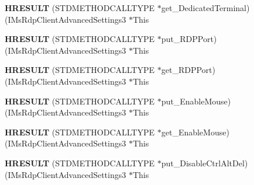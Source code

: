 \begin{DoxyCompactItemize}
\mbox{\label{struct_i_ms_rdp_client_advanced_settings3_vtbl_a5ea44e8e6ebad06757ed384928975116}} 
{\bfseries H\+R\+E\+S\+U\+LT} (S\+T\+D\+M\+E\+T\+H\+O\+D\+C\+A\+L\+L\+T\+Y\+PE $\ast$get\+\_\+\+Dedicated\+Terminal)(I\+Ms\+Rdp\+Client\+Advanced\+Settings3 $\ast$This
\item 
\mbox{\label{struct_i_ms_rdp_client_advanced_settings3_vtbl_ab1a172377b0c5ec4c281a64af648d1d4}} 
{\bfseries H\+R\+E\+S\+U\+LT} (S\+T\+D\+M\+E\+T\+H\+O\+D\+C\+A\+L\+L\+T\+Y\+PE $\ast$put\+\_\+\+R\+D\+P\+Port)(I\+Ms\+Rdp\+Client\+Advanced\+Settings3 $\ast$This
\item 
\mbox{\label{struct_i_ms_rdp_client_advanced_settings3_vtbl_a48acd1d762df5e480533a343f26c7cfc}} 
{\bfseries H\+R\+E\+S\+U\+LT} (S\+T\+D\+M\+E\+T\+H\+O\+D\+C\+A\+L\+L\+T\+Y\+PE $\ast$get\+\_\+\+R\+D\+P\+Port)(I\+Ms\+Rdp\+Client\+Advanced\+Settings3 $\ast$This
\item 
\mbox{\label{struct_i_ms_rdp_client_advanced_settings3_vtbl_a06a9c6b74b1d1fa429956ccb4242fb3f}} 
{\bfseries H\+R\+E\+S\+U\+LT} (S\+T\+D\+M\+E\+T\+H\+O\+D\+C\+A\+L\+L\+T\+Y\+PE $\ast$put\+\_\+\+Enable\+Mouse)(I\+Ms\+Rdp\+Client\+Advanced\+Settings3 $\ast$This
\item 
\mbox{\label{struct_i_ms_rdp_client_advanced_settings3_vtbl_aac3562d4b808014c2419c41a13f5f0e8}} 
{\bfseries H\+R\+E\+S\+U\+LT} (S\+T\+D\+M\+E\+T\+H\+O\+D\+C\+A\+L\+L\+T\+Y\+PE $\ast$get\+\_\+\+Enable\+Mouse)(I\+Ms\+Rdp\+Client\+Advanced\+Settings3 $\ast$This
\item 
\mbox{\label{struct_i_ms_rdp_client_advanced_settings3_vtbl_afb2ba47be2ba24b17eeaf02efeca7523}} 
{\bfseries H\+R\+E\+S\+U\+LT} (S\+T\+D\+M\+E\+T\+H\+O\+D\+C\+A\+L\+L\+T\+Y\+PE $\ast$put\+\_\+\+Disable\+Ctrl\+Alt\+Del)(I\+Ms\+Rdp\+Client\+Advanced\+Settings3 $\ast$This
\item 
\mbox{\label{struct_i_ms_rdp_client_advanced_settings3_vtbl_a402de980413fdf52eec4269b80c47fe1}} 

\end{DoxyCompactItemize}

